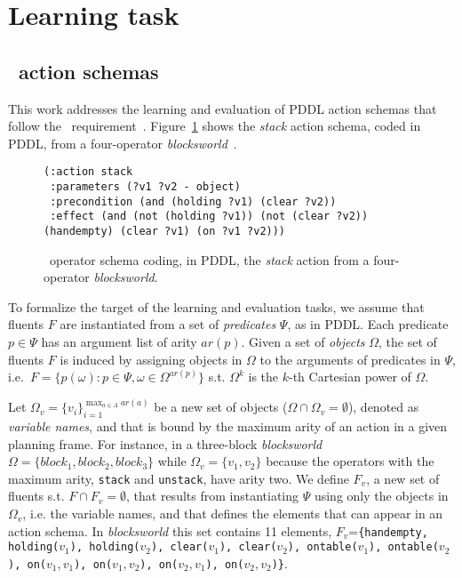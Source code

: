 \section{Learning task}
\label{learning_task}


\subsection{\strips\ action schemas}
This work addresses the learning and evaluation of PDDL action schemas that follow the \strips\ requirement~\cite{mcdermott1998pddl,fox2003pddl2}. Figure~\ref{fig:stack} shows the {\em stack} action schema, coded in PDDL, from a four-operator {\em blocksworld}~\cite{slaney2001blocks}.

\begin{figure}[hbt!]
\begin{footnotesize}
\begin{verbatim}
(:action stack
 :parameters (?v1 ?v2 - object)
 :precondition (and (holding ?v1) (clear ?v2))
 :effect (and (not (holding ?v1)) (not (clear ?v2)) (handempty) (clear ?v1) (on ?v1 ?v2)))
\end{verbatim}
\end{footnotesize}
 \caption{\small \strips\ operator schema coding, in PDDL, the {\em stack} action from a four-operator {\em blocksworld}.}
\label{fig:stack}
\end{figure}

To formalize the target of the learning and evaluation tasks, we assume that fluents $F$ are instantiated from a set of {\em predicates} $\Psi$, as in PDDL. Each predicate $p\in\Psi$ has an argument list of arity $ar(p)$. Given a set of {\em objects} $\Omega$, the set of fluents $F$ is induced by assigning objects in $\Omega$ to the arguments of predicates in $\Psi$, i.e.~$F=\{p(\omega):p\in\Psi,\omega\in\Omega^{ar(p)}\}$ s.t. $\Omega^k$ is the $k$-th Cartesian power of $\Omega$.

Let $\Omega_v=\{v_i\}_{i=1}^{\operatorname*{max}_{a\in A} ar(a)}$ be a new set of objects ($\Omega\cap\Omega_v=\emptyset$), denoted as {\em variable names}, and that is bound by the maximum arity of an action in a given planning frame. For instance, in a three-block {\em blocksworld} $\Omega=\{block_1, block_2, block_3\}$ while $\Omega_v=\{v_1, v_2\}$ because the operators with the maximum arity, {\small\tt stack} and {\small\tt unstack}, have arity two. We define $F_v$, a new set of fluents s.t. $F\cap F_v=\emptyset$, that results from instantiating $\Psi$ using only the objects in $\Omega_v$, i.e. the variable names, and that defines the elements that can appear in an action schema. In {\em blocksworld} this set contains 11 elements, $F_v$={\small\tt\{handempty, holding($v_1$), holding($v_2$), clear($v_1$), clear($v_2$), ontable($v_1$), ontable($v_2$), on($v_1,v_1$), on($v_1,v_2$), on($v_2,v_1$), on($v_2,v_2$)\}}.

